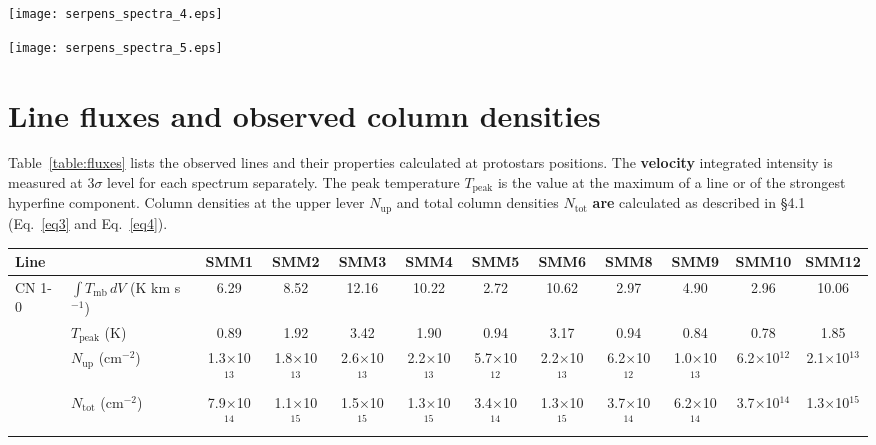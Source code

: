 \documentclass{aa}
\begin{document}
\begin{appendix}
\begin{figure*}
\centering 
\texttt{[image: serpens\_spectra\_4.eps]}
\label{Spectra4} 
\end{figure*}

\begin{figure*} 
\centering
\texttt{[image: serpens\_spectra\_5.eps]} 
\caption{Serpens Main sources spectra of CO 6-5, C$^{34}$S 3-2, CS 3-2 , H$^{13}$CN 2-1, H$^{13}$CN 1-0,
HCN 1-0 and CN 1-0 lines.} 
\label{Spectra_all}
\end{figure*}

\section{Line fluxes and observed column densities}
\label{app:fluxes}

Table~\ref{table:fluxes} lists the observed lines and their properties calculated at protostars positions. The \textbf{velocity} integrated intensity is measured at 3$\sigma$ level for each spectrum separately. The peak temperature $T_\mathrm{peak}$ is the value at the maximum of a line or of the strongest hyperfine component. Column densities at the upper lever $N_\mathrm{up}$ and total column densities $N_\mathrm{tot}$ \textbf{are} calculated as described in \S 4.1 (Eq.~\ref{eq3} and Eq.~\ref{eq4}).

\begin{sidewaystable*}
\caption{Integrated fluxes of the observed line at the positions of protostars}\label{table:fluxes}
\centering
\begin{tabular}{l l c c c c c c c c c c} 
\hline\hline 
Line & & SMM1 & SMM2 & SMM3 & SMM4 & SMM5 & SMM6 & SMM8 & SMM9 & SMM10 & SMM12 \\
\hline \multirow{4}{*}{CN 1-0} & $\int{T_{\mathrm{mb}} \, dV}$ (K km s$^{-1}$) & 6.29 & 8.52 & 12.16 & 10.22 & 2.72 & 10.62 & 2.97 & 4.90 & 2.96 & 10.06 \\
& $T_\mathrm{peak}$ (K) & 0.89 & 1.92 & 3.42 & 1.90 & 0.94 & 3.17 & 0.94 & 0.84 & 0.78 & 1.85 \\
& $N_\mathrm{up}$ (cm$^{-2}$) & 1.3$\times$10$^{13}$ & 1.8$\times$10$^{13}$ & 2.6$\times$10$^{13}$ & 2.2$\times$10$^{13}$ & 5.7$\times$10$^{12}$ & 2.2$\times$10$^{13}$ & 6.2$\times$10$^{12}$ & 1.0$\times$10$^{13}$ & 6.2$\times$10$^{12}$ & 2.1$\times$10$^{13}$ \\
& $N_\mathrm{tot}$ (cm$^{-2}$) & 7.9$\times$10$^{14}$ & 1.1$\times$10$^{15}$ & 1.5$\times$10$^{15}$ & 1.3$\times$10$^{15}$ & 3.4$\times$10$^{14}$ & 1.3$\times$10$^{15}$ & 3.7$\times$10$^{14}$ & 6.2$\times$10$^{14}$ & 3.7$\times$10$^{14}$ & 1.3$\times$10$^{15}$\\


\end{tabular}
\end{sidewaystable*}
\end{appendix}
\end{document}
